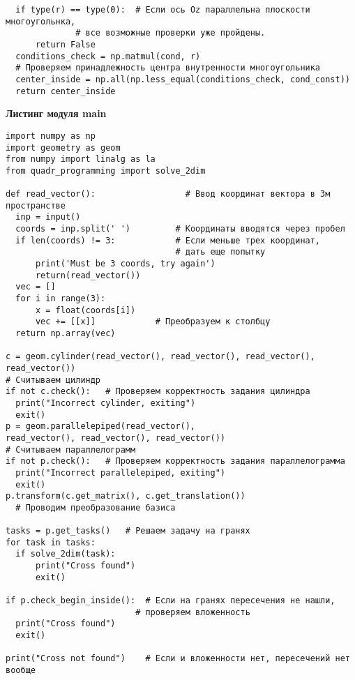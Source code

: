 \documentclass[pdftex,ptm,12pt,a4paper]{report}
\begin{document}
\begin{verbatim}
  if type(r) == type(0):  # Если ось Oz параллельна плоскости многоугольнка,
              # все возможные проверки уже пройдены.
      return False
  conditions_check = np.matmul(cond, r)
  # Проверяем принадлежность центра внутренности многоугольника
  center_inside = np.all(np.less_equal(conditions_check, cond_const))
  return center_inside

\end{verbatim}

\textbf{Листинг модуля main}
\begin{verbatim}
import numpy as np
import geometry as geom
from numpy import linalg as la
from quadr_programming import solve_2dim

def read_vector():                  # Ввод координат вектора в 3м пространстве
  inp = input()
  coords = inp.split(' ')         # Координаты вводятся через пробел
  if len(coords) != 3:            # Если меньше трех координат,
                                  # дать еще попытку
      print('Must be 3 coords, try again')
      return(read_vector())
  vec = []
  for i in range(3):
      x = float(coords[i])
      vec += [[x]]            # Преобразуем к столбцу
  return np.array(vec)

c = geom.cylinder(read_vector(), read_vector(), read_vector(), read_vector())
# Считываем цилиндр
if not c.check():   # Проверяем корректность задания цилиндра
  print("Incorrect cylinder, exiting")
  exit()
p = geom.parallelepiped(read_vector(),
read_vector(), read_vector(), read_vector())
# Считываем параллелограмм
if not p.check():   # Проверяем корректность задания параллелограмма
  print("Incorrect parallelepiped, exiting")
  exit()
p.transform(c.get_matrix(), c.get_translation())
  # Проводим преобразование базиса

tasks = p.get_tasks()   # Решаем задачу на гранях
for task in tasks:
  if solve_2dim(task):
      print("Cross found")
      exit()

if p.check_begin_inside():  # Если на гранях пересечения не нашли,
                          # проверяем вложенность
  print("Cross found")
  exit()

print("Cross not found")    # Если и вложенности нет, пересечений нет вообще

\end{verbatim}
\end{document}
